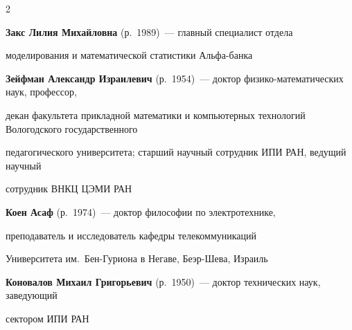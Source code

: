 \begin{multicols}{2}
\vspace*{4pt}



\noindent

\textbf{Закс Лилия Михайловна} (р.\ 1989)~--- главный специалист отдела 

моделирования и математической статистики Аль\-фа-банка



\columnbreak






\noindent

\textbf{Зейфман Александр Израилевич} (р.\ 1954)~--- доктор фи\-зи\-ко-ма\-те\-ма\-ти\-че\-ских наук, профессор,

декан факультета прикладной математики и компьютерных технологий Вологодского государственного

педагогического университета; старший научный сотрудник ИПИ РАН, ведущий научный

сотрудник ВНКЦ ЦЭМИ РАН



\vspace*{4pt}







\noindent

\textbf{Коен Асаф} (р.\ 1974)~--- доктор философии по электротехнике, 

преподаватель и исследователь ка\-фед\-ры телекоммуникаций 

Университета им.\ Бен-Гу\-ри\-она в Негаве, Беэр-Шева, Израиль



\vspace*{4pt}





\noindent

\textbf{Коновалов Михаил Григорьевич} (р.\ 1950)~--- доктор технических наук, заведующий

сектором ИПИ РАН





\vspace*{4pt}





\noindent


\end{multicols}
